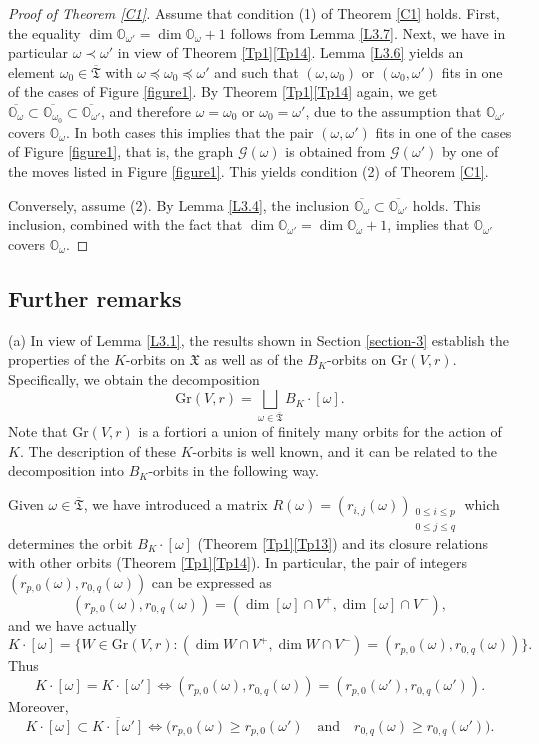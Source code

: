 \documentclass[ALCO,Unicode]{cedram}
\newcommand{\Xorbit}{\mathbb{O}}
\newcommand{\ppermutationsof}{\mathfrak{T}}
\newcommand{\parameters}{\overline{\ppermutationsof}}
\newcommand{\Xfv}{\mathfrak{X}}
\newcommand{\Grass}{\mathrm{Gr}}
\begin{document}
\begin{proof}[Proof of Theorem \ref{C1}]
Assume that condition (1) of Theorem \ref{C1} holds.
First, the equality
$\dim\Xorbit_{\omega'}=\dim\Xorbit_\omega+1$
follows from Lemma \ref{L3.7}.
Next, we have in particular $\omega\prec\omega'$ in view of Theorem \ref{Tp1}\ref{Tp14}. Lemma \ref{L3.6} yields an element $\omega_0\in\parameters$ with $\omega\preceq\omega_0\preceq\omega'$ and such that $(\omega,\omega_0)$ or $(\omega_0,\omega')$ fits in one of the cases of Figure \ref{figure1}. By Theorem \ref{Tp1}\ref{Tp14} again, we get $\overline{\Xorbit_\omega}\subset\overline{\Xorbit_{\omega_0}}\subset\overline{\Xorbit_{\omega'}}$, and therefore $\omega=\omega_0$ or $\omega_0=\omega'$, due to the assumption that $\Xorbit_{\omega'}$ covers $\Xorbit_\omega$. In both cases this implies that the pair $(\omega,\omega')$ fits in one of the cases of Figure \ref{figure1}, that is, the graph $\mathcal{G}(\omega)$ is obtained from $\mathcal{G}(\omega')$ by one of the moves listed in Figure \ref{figure1}. This yields condition (2) of Theorem \ref{C1}.

Conversely, assume (2). By Lemma \ref{L3.4}, the inclusion $\overline{\Xorbit_\omega}\subset\overline{\Xorbit_{\omega'}}$ holds. This inclusion, combined with the fact that $\dim\Xorbit_{\omega'}=\dim\Xorbit_\omega+1$, implies that $\Xorbit_{\omega'}$ covers $\Xorbit_\omega$.
\end{proof}

\subsection{Further remarks}

\label{section-3.4}

(a)
In view of Lemma \ref{L3.1}, the results shown in Section \ref{section-3} establish the properties of
the $K$-orbits on $\Xfv$ as well as of the $B_K$-orbits on $\Grass(V,r)$.
Specifically, we obtain the decomposition
\[
\Grass(V,r)=\bigsqcup_{\omega\in\parameters} B_K\cdot[\omega].
\]
Note that $\Grass(V,r)$ is a fortiori a union of finitely many orbits for the action of $K$.
The description of these $K$-orbits is well known,
and it can be related to the decomposition into $B_K$-orbits in the following way.

Given $\omega\in\parameters$, we have introduced a matrix $R(\omega)=(r_{i,j}(\omega))_{\substack{0\leq i\leq p\\ 0\leq j\leq q}}$ which determines the orbit $B_K\cdot[\omega]$ (Theorem \ref{Tp1}\ref{Tp13}) and its closure relations with other orbits (Theorem \ref{Tp1}\ref{Tp14}).
In particular, the pair of integers $(r_{p,0}(\omega),r_{0,q}(\omega))$ can be expressed as
\[
(r_{p,0}(\omega),r_{0,q}(\omega))=(\dim [\omega]\cap V^+,\dim [\omega]\cap V^-),
\]
and we have actually
\[
K\cdot[\omega]=\{W\in\Grass(V,r):(\dim W\cap V^+,\dim W\cap V^-)=(r_{p,0}(\omega),r_{0,q}(\omega))\}.
\]
Thus
\[
K\cdot[\omega]=K\cdot[\omega']\Longleftrightarrow (r_{p,0}(\omega),r_{0,q}(\omega))=(r_{p,0}(\omega'),r_{0,q}(\omega')).
\]
Moreover,
\[
K\cdot[\omega]\subset\overline{K\cdot[\omega']}\Longleftrightarrow \big(r_{p,0}(\omega)\geq r_{p,0}(\omega')\quad\mbox{and}\quad r_{0,q}(\omega)\geq r_{0,q}(\omega')\big).
\]
\end{document}
